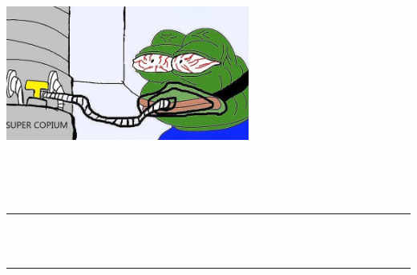 \begin{titlepage}

\newcommand{\HRule}{\rule{\linewidth}{0.5mm}} %

\centering
\includegraphics[width=8cm]{title/fun-logo.png}\\[1cm] %
 

\center %


\textsc{\LARGE \assignname}\\[1.5cm] %
\textsc{\Large \coursecode}\\[0.5cm] %
\textsc{\large \coursetitle}\\[0.5cm]  %

\makeatletter
\HRule \\[0.4cm]
{ \huge \bfseries \@title}\\[0.4cm] %
\HRule \\[1.5cm]
 


\end{titlepage}
